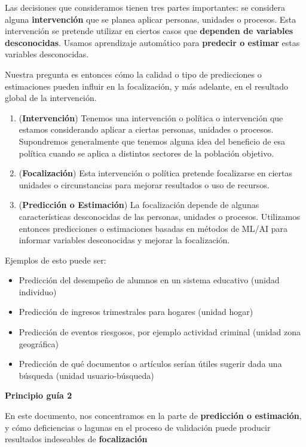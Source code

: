 \documentclass[
]{book}
\providecommand{\tightlist}{%
  \setlength{\itemsep}{0pt}\setlength{\parskip}{0pt}}
\let\BeginKnitrBlock\begin \let\EndKnitrBlock\end
\begin{document}
Las decisiones que consideramos tienen tres partes importantes: se considera
alguna \textbf{intervención} que se
planea aplicar personas, unidades o procesos. Esta intervención se pretende utilizar en ciertos casos
que \textbf{dependen de variables desconocidas}. Usamos aprendizaje automático para \textbf{predecir o estimar} estas variables desconocidas.

Nuestra pregunta es entonces cómo la calidad o tipo de predicciones o estimaciones pueden
influir en la focalización, y más adelante, en el resultado global de la intervención.

\begin{enumerate}
\def\labelenumi{\arabic{enumi}.}
\item
  (\textbf{Intervención}) Tenemos una intervención o política o intervención que estamos considerando aplicar a ciertas
  personas, unidades o procesos. Supondremos generalmente que tenemos alguna idea del beneficio de esa política cuando se aplica a distintos sectores de la población objetivo.
\item
  (\textbf{Focalización}) Esta intervención o política pretende focalizarse en ciertas unidades o circunstancias para mejorar resultados o uso de recursos.
\item
  (\textbf{Predicción o Estimación}) La focalización depende de algunas características desconocidas de las personas, unidades o procesos. Utilizamos entonces predicciones o estimaciones basadas en métodos de ML/AI para informar variables desconocidas y mejorar la focalización.
\end{enumerate}

Ejemplos de esto puede ser:

\begin{itemize}
\tightlist
\item
  Predicción del desempeño de alumnos en un sistema educativo (unidad individuo)
\item
  Predicción de ingresos trimestrales para hogares (unidad hogar)
\item
  Predicción de eventos riesgosos, por ejemplo actividad criminal (unidad zona geográfica)
\item
  Predicción de qué documentos o artículos serían útiles sugerir dada una búsqueda (unidad
  usuario-búsqueda)
\end{itemize}

\BeginKnitrBlock{rmdpunto}
\textbf{Principio guía 2}

En este documento, nos concentramos en la parte de \textbf{predicción o estimación}, y cómo deficiencias o lagunas en el proceso
de validación puede producir resultados indeseables de \textbf{focalización}
\EndKnitrBlock{rmdpunto}
\end{document}

